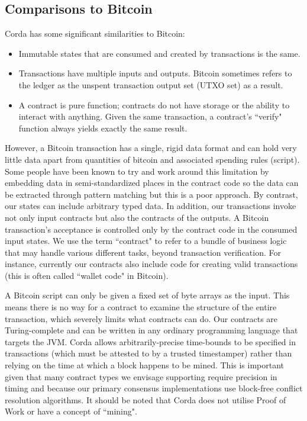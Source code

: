 \documentclass{article}
\begin{document}
\subsection{Comparisons to Bitcoin}
Corda has some significant similarities to Bitcoin: 
\begin{itemize}
\item{Immutable states that are consumed and created by transactions is the same.}
\item{Transactions have multiple inputs and outputs. Bitcoin sometimes refers to the ledger as the unspent transaction output set (UTXO set) as a result.}
\item{A contract is pure function; contracts do not have storage or the ability to interact with anything. Given the same transaction, a contract's ``verify" function always yields exactly the same result.}
\end{itemize}

However, a Bitcoin transaction has a single, rigid data format and can hold very little data apart from quantities of bitcoin and associated spending rules (script). Some people have been known to try and work around this limitation by embedding data in semi-standardized places in the contract code so the data can be extracted through pattern matching but this is a poor approach. By contrast, our states can include arbitrary typed data. In addition, our transactions invoke not only input contracts but also the contracts of the outputs. A Bitcoin transaction's acceptance is controlled only by the contract code in the consumed input states. We use the term ``contract" to refer to a bundle of business logic that may handle various different tasks, beyond transaction verification. For instance, currently our contracts also include code for creating valid transactions (this is often called ``wallet code" in Bitcoin).


A Bitcoin script can only be given a fixed set of byte arrays as the input. This means there is no way for a contract to examine the structure of the entire transaction, which severely limits what contracts can do. Our contracts are Turing-complete and can be written in any ordinary programming language that targets the JVM.	
Corda allows arbitrarily-precise time-bounds to be specified in transactions (which must be attested to by a trusted timestamper) rather than relying on the time at which a block happens to be mined.  This is important given that many contract types we envisage supporting require precision in timing and because our primary consensus implementations use block-free conflict resolution algorithms. It should be noted that Corda does not utilise Proof of Work or have a concept of ``mining".
\end{document}
